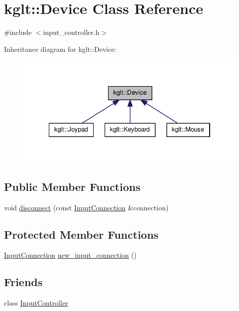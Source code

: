 \hypertarget{classkglt_1_1_device}{\section{kglt\-:\-:Device Class Reference}
\label{classkglt_1_1_device}
}


{\ttfamily \#include $<$input\-\_\-controller.\-h$>$}



Inheritance diagram for kglt\-:\-:Device\-:\nopagebreak
\begin{figure}[H]
\begin{center}
\leavevmode
\includegraphics[width=334pt]{classkglt_1_1_device__inherit__graph}
\end{center}
\end{figure}
\subsection*{Public Member Functions}
\begin{DoxyCompactItemize}
\item 
void \hyperlink{classkglt_1_1_device_af8e135f09918ba7747d525c16835cc6f}{disconnect} (const \hyperlink{classkglt_1_1_input_connection}{Input\-Connection} \&connection)
\end{DoxyCompactItemize}
\subsection*{Protected Member Functions}
\begin{DoxyCompactItemize}
\item 
\hyperlink{classkglt_1_1_input_connection}{Input\-Connection} \hyperlink{classkglt_1_1_device_af4fd3d0c4eb4f4dda7a735936edf396d}{new\-\_\-input\-\_\-connection} ()
\end{DoxyCompactItemize}
\subsection*{Friends}
\begin{DoxyCompactItemize}
\item 
class \hyperlink{classkglt_1_1_device_a083d5a8d8c2dd3a28d1f55d2965db0ab}{Input\-Controller}
\end{DoxyCompactItemize}


